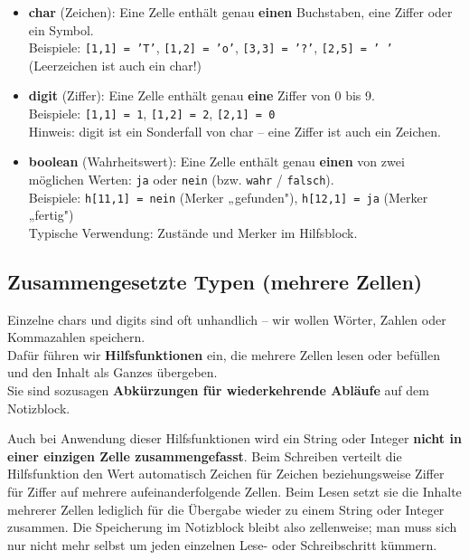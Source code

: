 \documentclass{article}
\begin{document}
        \begin{itemize}
          \item \textbf{char} (Zeichen): Eine Zelle enthält genau \textbf{einen} Buchstaben, eine Ziffer oder ein Symbol.\\
            Beispiele: \texttt{[1,1] = 'T'}, \texttt{[1,2] = 'o'}, \texttt{[3,3] = '?'}, \texttt{[2,5] = ' '} (Leerzeichen ist auch ein char!)

          \item \textbf{digit} (Ziffer): Eine Zelle enthält genau \textbf{eine} Ziffer von 0 bis 9.\\
            Beispiele: \texttt{[1,1] = 1}, \texttt{[1,2] = 2}, \texttt{[2,1] = 0}\\
            Hinweis: digit ist ein Sonderfall von char – eine Ziffer ist auch ein Zeichen.

          \item \textbf{boolean} (Wahrheitswert): Eine Zelle enthält genau \textbf{einen} von zwei möglichen Werten: \texttt{ja} oder \texttt{nein} (bzw. \texttt{wahr} / \texttt{falsch}).\\
            Beispiele: \texttt{h[11,1] = nein} (Merker „gefunden"), \texttt{h[12,1] = ja} (Merker „fertig")\\
            Typische Verwendung: Zustände und Merker im Hilfsblock.

        \end{itemize}

        \subsection{Zusammengesetzte Typen (mehrere Zellen)}

        
Einzelne chars und digits sind oft unhandlich – wir wollen Wörter, Zahlen oder Kommazahlen speichern.\\
          Dafür führen wir \textbf{Hilfsfunktionen} ein, die mehrere Zellen lesen oder befüllen und den Inhalt als Ganzes übergeben.\\
          Sie sind sozusagen \textbf{Abkürzungen für wiederkehrende Abläufe} auf dem Notizblock.

Auch bei Anwendung dieser Hilfsfunktionen wird ein String oder Integer \textbf{nicht in einer einzigen Zelle zusammengefasst}. Beim Schreiben verteilt die Hilfsfunktion den Wert automatisch Zeichen für Zeichen beziehungsweise Ziffer für Ziffer auf mehrere aufeinanderfolgende Zellen. Beim Lesen setzt sie die Inhalte mehrerer Zellen lediglich für die Übergabe wieder zu einem String oder Integer zusammen. Die Speicherung im Notizblock bleibt also zellenweise; man muss sich nur nicht mehr selbst um jeden einzelnen Lese- oder Schreibschritt kümmern.
\end{document}
